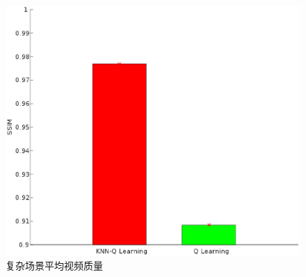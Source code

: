 \documentclass[twocolumn]{article}
\begin{document}
\begin{figure}[htbp]
\centering
\includegraphics[width=\columnwidth]{complex_ssim_bar_graph}
\caption{复杂场景平均视频质量}
\label{complex_ssim_bar_graph}
\end{figure}
\end{document}
